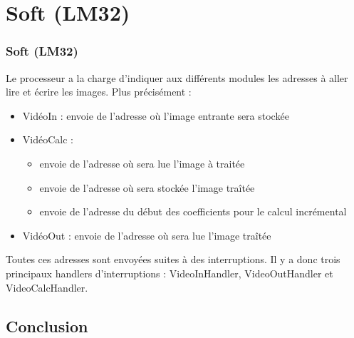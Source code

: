 \documentclass[a4paper,12pt]{report}
\begin{document}
{}










    \part{Soft (LM32)} 

    \section*{Soft (LM32)}

{Le processeur a la charge d'indiquer aux différents modules les adresses à aller lire et écrire les images. Plus précisément :

\begin{itemize}
	\item VidéoIn : envoie de l'adresse où l'image entrante sera stockée
	\item VidéoCalc : \begin{itemize}
								\item envoie de l'adresse où sera lue l'image à traitée
								\item envoie de l'adresse où sera stockée l'image traîtée
								\item envoie de l'adresse du début des coefficients pour le calcul incrémental
							\end{itemize}
	\item VidéoOut : envoie de l'adresse où sera lue l'image traîtée
\end{itemize}

Toutes ces adresses sont envoyées suites à des interruptions.
Il y a donc trois principaux handlers d'interruptions : VideoInHandler, VideoOutHandler et VideoCalcHandler.
}



 
    \chapter*{Conclusion}
{}


\end{document}
